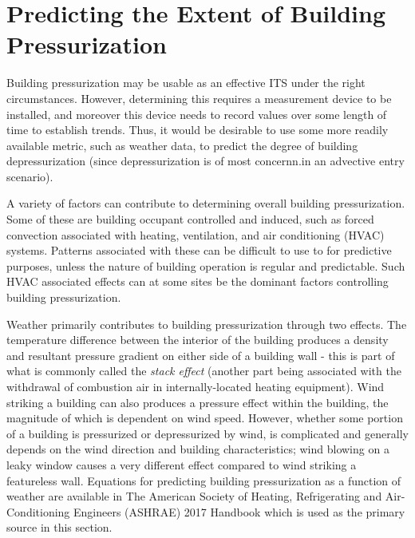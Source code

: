 \section{Predicting the Extent of Building Pressurization}

Building pressurization may be usable as an effective ITS under the right circumstances.
However, determining this requires a measurement device to be installed, and moreover this device needs to record values over some length of time to establish trends.
Thus, it would be desirable to use some more readily available metric, such as weather data, to predict the degree of building depressurization (since depressurization is of most concernn.in an advective entry scenario).\par

A variety of factors can contribute to determining overall building pressurization.
Some of these are building occupant controlled and induced, such as forced convection associated with heating, ventilation, and air conditioning (HVAC) systems.
Patterns associated with these can be difficult to use to for predictive purposes, unless the nature of building operation is regular and predictable.
Such HVAC associated effects can at some sites be the dominant factors controlling building pressurization.\par

Weather primarily contributes to building pressurization through two effects.
The temperature difference between the interior of the building produces a density and resultant pressure gradient on either side of a building wall - this is part of what is commonly called the \textit{stack effect} (another part being associated with the withdrawal of combustion air in internally-located heating equipment).
Wind striking a building can also produces a pressure effect within the building, the magnitude of which is dependent on wind speed.
However, whether some portion of a building is pressurized or depressurized by wind, is complicated and generally depends on the wind direction and building characteristics; wind blowing on a leaky window causes a very different effect compared to wind striking a featureless wall.
Equations for predicting building pressurization as a function of weather are available in The American Society of Heating, Refrigerating and Air-Conditioning Engineers (ASHRAE) 2017 Handbook\cite{american_society_of_heating_2017_nodate} which is used as the primary source in this section.\par


